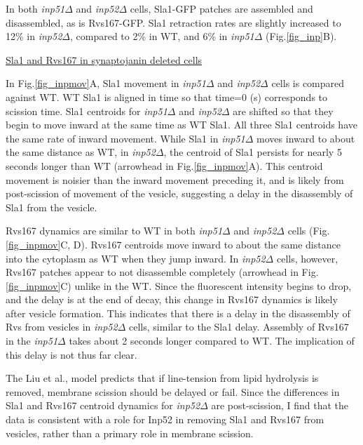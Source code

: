 	
In both \textit{inp51$\Delta$} and \textit{inp52$\Delta$} cells, Sla1-GFP patches are assembled and disassembled, as is Rvs167-GFP. Sla1 retraction rates are slightly increased to 12\% in \textit{inp52$\Delta$}, compared to 2\% in WT, and 6\% in \textit{inp51$\Delta$}
(Fig.\ref{fig_inp}B). 
\vspace{5mm}

\underline{Sla1 and Rvs167 in synaptojanin deleted cells}

 In Fig.\ref{fig_inpmov}A, Sla1 movement in \textit{inp51$\Delta$} and \textit{inp52$\Delta$}
 cells is compared against WT. WT Sla1 is aligned in time so that time=0 (s) corresponds to scission time. Sla1 centroids for \textit{inp51$\Delta$} and \textit{inp52$\Delta$} are shifted so that they begin to move inward at the same time as WT Sla1. All three Sla1 centroids have the same rate of inward movement. While Sla1 in \textit{inp51$\Delta$} moves inward to about the same distance as WT, in \textit{inp52$\Delta$}, the centroid of Sla1 persists for nearly 5 seconds longer than WT (arrowhead in Fig.\ref{fig_inpmov}A). This centroid movement is noisier than the inward movement preceding it, and is likely from post-scission of movement of the vesicle, suggesting a delay in the disassembly of Sla1 from the vesicle. 


\vspace{5mm}	
Rvs167 dynamics are similar to WT in both \textit{inp51$\Delta$}
 and \textit{inp52$\Delta$} cells (Fig.\ref{fig_inpmov}C, D). Rvs167 centroids move inward to about the same distance into the cytoplasm as WT when they jump inward. In \textit{inp52$\Delta$} cells, however, Rvs167 patches appear to not disassemble completely (arrowhead in Fig.\ref{fig_inpmov}C) unlike in the WT. Since the fluorescent intensity begins to drop, and the delay is at the end of decay, this change in Rvs167 dynamics is likely after vesicle formation. This indicates that there is a delay in the disassembly of Rvs from vesicles in \textit{inp52$\Delta$} cells, similar to the Sla1 delay. Assembly of Rvs167 in the \textit{inp51$\Delta$}
 takes about 2 seconds longer compared to WT. The implication of this delay is not thus far clear. 

	\vspace{5mm}
The Liu et al., model predicts that if line-tension from lipid hydrolysis is removed, membrane scission should be delayed or fail. Since the differences in Sla1 and Rvs167 centroid dynamics for \textit{inp52$\Delta$} are post-scission, I find that the data is consistent with a role for Inp52 in removing Sla1 and Rvs167 from vesicles, rather than a primary role in membrane scission. 


